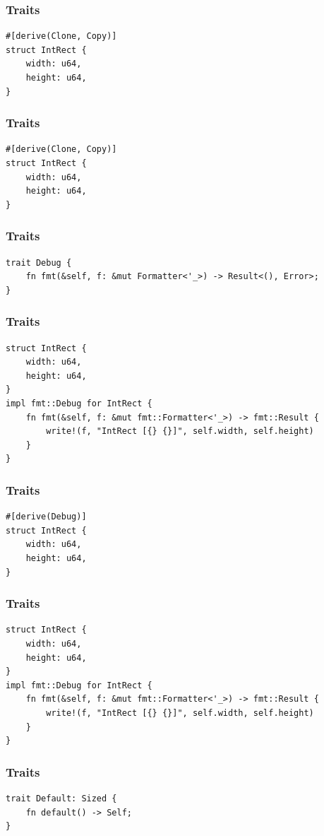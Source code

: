 \begin{frame}[fragile]
    \frametitle{Traits}
    \begin{verbatim}
#[derive(Clone, Copy)]
struct IntRect {
    width: u64,
    height: u64,
}
    \end{verbatim}
\end{frame}

\begin{frame}[fragile]
    \frametitle{Traits}
    \begin{verbatim}
#[derive(Clone, Copy)]
struct IntRect {
    width: u64,
    height: u64,
}
    \end{verbatim}
\end{frame}

\begin{frame}[fragile]
    \frametitle{Traits}
    \begin{verbatim}
trait Debug {
    fn fmt(&self, f: &mut Formatter<'_>) -> Result<(), Error>;
}
    \end{verbatim}
\end{frame}

\begin{frame}[fragile]
    \frametitle{Traits}
    \begin{verbatim}
struct IntRect {
    width: u64,
    height: u64,
}
impl fmt::Debug for IntRect {
    fn fmt(&self, f: &mut fmt::Formatter<'_>) -> fmt::Result {
        write!(f, "IntRect [{} {}]", self.width, self.height)
    }
}
    \end{verbatim}
\end{frame}

\begin{frame}[fragile]
    \frametitle{Traits}
    \begin{verbatim}
#[derive(Debug)]
struct IntRect {
    width: u64,
    height: u64,
}
    \end{verbatim}
\end{frame}

\begin{frame}[fragile]
    \frametitle{Traits}
    \begin{verbatim}
struct IntRect {
    width: u64,
    height: u64,
}
impl fmt::Debug for IntRect {
    fn fmt(&self, f: &mut fmt::Formatter<'_>) -> fmt::Result {
        write!(f, "IntRect [{} {}]", self.width, self.height)
    }
}
    \end{verbatim}
\end{frame}

\begin{frame}[fragile]
    \frametitle{Traits}
    \begin{verbatim}
trait Default: Sized {
    fn default() -> Self;
}
    \end{verbatim}
\end{frame}

